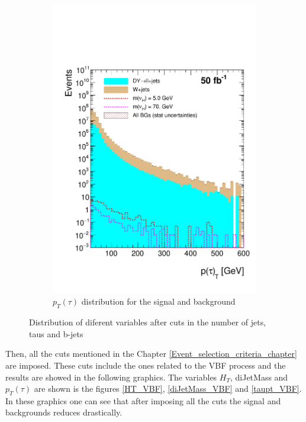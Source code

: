 \begin{figure}[h]
\begin{subfigure}{.5\textwidth}
  \includegraphics[width=1.1\linewidth]{./Capitulos/Analysis/AfterBJets/TauPt_MET_20}
  \caption{$p_T(\tau)$ distribution for the signal and background}
  \label{taupt_bjets}
\end{subfigure}
\caption{Distribution of diferent variables after cuts in the number of jets, taus and b-jets}
\label{Variables_bjets}
\end{figure}
 
 Then, all the cuts mentioned in the Chapter \ref{Event_selection_criteria_chapter} are imposed. These cuts include the ones related to the VBF process and the results are showed in the following graphics. The variables $H_T$, diJetMass and $p_T(\tau)$ are shown is the figures \ref{HT_VBF}, \ref{diJetMass_VBF} and \ref{taupt_VBF}. In these graphics one can see that after imposing all the cuts the signal and backgrounds reduces drastically. 
 
